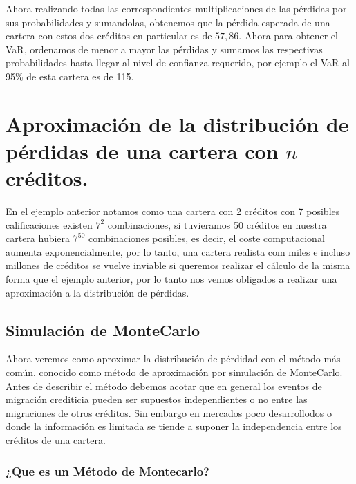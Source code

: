 \documentclass[
  12pt,
]{krantz}
\theoremstyle{definition}
\theoremstyle{definition}
\theoremstyle{definition}
\theoremstyle{remark}
\begin{document}
Ahora realizando todas las correspondientes multiplicaciones de las pérdidas por sus probabilidades y sumandolas, obtenemos que la pérdida esperada de una cartera con estos dos créditos en particular es de \(57,86\). Ahora para obtener el VaR, ordenamos de menor a mayor las pérdidas y sumamos las respectivas probabilidades hasta llegar al nivel de confianza requerido, por ejemplo el VaR al 95\% de esta cartera es de 115.

\hypertarget{aproximacion-de-la-distribucion-de-perdidas-de-una-cartera-con-n-creditos.}{%
\section{\texorpdfstring{Aproximación de la distribución de pérdidas de una cartera con \(n\) créditos.}{Aproximación de la distribución de pérdidas de una cartera con n créditos.}}\label{aproximacion-de-la-distribucion-de-perdidas-de-una-cartera-con-n-creditos.}}

En el ejemplo anterior notamos como una cartera con 2 créditos con 7 posibles calificaciones existen \(7^2\) combinaciones, si tuvieramos 50 créditos en nuestra cartera hubiera \(7^{50}\) combinaciones posibles, es decir, el coste computacional aumenta exponencialmente, por lo tanto, una cartera realista com miles e incluso millones de créditos se vuelve inviable si queremos realizar el cálculo de la misma forma que el ejemplo anterior, por lo tanto nos vemos obligados a realizar una aproximación a la distribución de pérdidas.

\hypertarget{simulacion-de-montecarlo}{%
\subsection{Simulación de MonteCarlo}\label{simulacion-de-montecarlo}}

Ahora veremos como aproximar la distribución de pérdidad con el método más común, conocido como método de aproximación por simulación de MonteCarlo. Antes de describir el método debemos acotar que en general los eventos de migración crediticia pueden ser supuestos independientes o no entre las migraciones de otros créditos. Sin embargo en mercados poco desarrollodos o donde la información es limitada se tiende a suponer la independencia entre los créditos de una cartera.

\hypertarget{que-es-un-metodo-de-montecarlo}{%
\subsubsection{¿Que es un Método de Montecarlo?}\label{que-es-un-metodo-de-montecarlo}}
\end{document}
